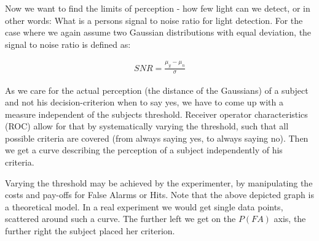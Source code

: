 \documentclass[../main/Notes.tex]{subfiles}
\begin{document}
Now we want to find the limits of perception - how few light can we detect, or in other words: What is a persons signal to noise ratio for light detection. For the case where we again assume two Gaussian distributions with equal deviation, the signal to noise ratio is defined as:

\begin{align*}
SNR = \frac{\mu_y-\mu_n}{\sigma}  
\end{align*} 

As we care for the actual perception (the distance of the Gaussians) of a subject and not his decision-criterion when to say yes, we have to come up with a measure independent of the subjects threshold. Receiver operator characteristics (ROC) allow for that by systematically varying the threshold, such that all possible criteria are covered (from always saying yes, to always saying no). Then we get a curve describing the perception of a subject independently of his criteria.

\bigskip
\begin{center}
\end{center}

Varying the threshold may be achieved by the experimenter, by manipulating the costs and pay-offs for False Alarms or Hits. Note that the above depicted graph is a theoretical model. In a real experiment we would get single data points, scattered around such a curve. The further left we get on the $P(FA)$ axis, the further right the subject placed her criterion.
 
\end{document}
